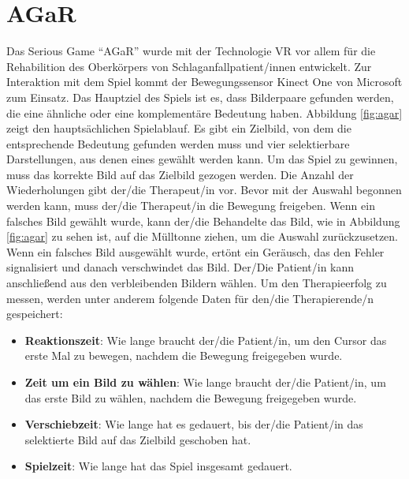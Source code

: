 \section{AGaR}\label{sec:agar}
Das Serious Game \enquote{AGaR} wurde mit der Technologie \ac{VR} vor allem für die Rehabilition des Oberkörpers von Schlaganfallpatient/innen entwickelt. Zur Interaktion mit dem Spiel kommt der Bewegungssensor Kinect One von Microsoft zum Einsatz. Das Hauptziel des Spiels ist es, dass Bilderpaare gefunden werden, die eine ähnliche oder eine komplementäre Bedeutung haben. Abbildung \ref{fig:agar} zeigt den hauptsächlichen Spielablauf. Es gibt ein Zielbild, von dem die entsprechende Bedeutung gefunden werden muss und vier selektierbare Darstellungen, aus denen eines gewählt werden kann. Um das Spiel zu gewinnen, muss das korrekte Bild auf das Zielbild gezogen werden. Die Anzahl der Wiederholungen gibt der/die Therapeut/in vor. Bevor mit der Auswahl begonnen werden kann, muss der/die Therapeut/in die Bewegung freigeben. Wenn ein falsches Bild gewählt wurde, kann der/die Behandelte das Bild, wie in Abbildung \ref{fig:agar} zu sehen ist, auf die Mülltonne ziehen, um die Auswahl zurückzusetzen. Wenn ein falsches Bild ausgewählt wurde, ertönt ein Geräusch, das den Fehler signalisiert  und danach verschwindet das Bild. Der/Die Patient/in kann anschließend aus den verbleibenden Bildern wählen. Um den Therapieerfolg zu messen, werden unter anderem folgende Daten für den/die Therapierende/n gespeichert: \cite{funabashi:agar:2017}

\begin{itemize}
	\item \textbf{Reaktionszeit}: Wie lange braucht der/die Patient/in, um den Cursor das erste Mal zu bewegen, nachdem die Bewegung freigegeben wurde.
	\item \textbf{Zeit um ein Bild zu wählen}: Wie lange braucht der/die Patient/in, um das erste Bild zu wählen, nachdem die Bewegung freigegeben wurde.
	\item \textbf{Verschiebzeit}: Wie lange hat es gedauert, bis der/die Patient/in das selektierte Bild auf das Zielbild geschoben hat. 
	\item \textbf{Spielzeit}: Wie lange hat das Spiel insgesamt gedauert.
\end{itemize}

